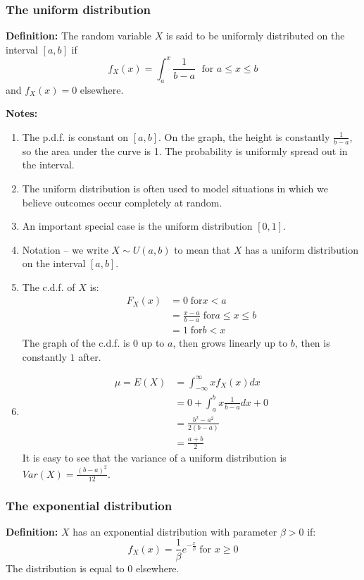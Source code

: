 \documentclass[12pt]{article}
\begin{document}
\subsubsection{The uniform distribution}
\textbf{Definition:} The random variable $X$ is said to be uniformly distributed on the interval $[a,b]$ if
\[
    f_X (x) = \int_a^x \frac{1}{b-a} \; \text{ for } a \leq x \leq b
\]
and $f_X (x) = 0$ elsewhere.

\textbf{Notes:}
\begin{enumerate}
    \item The p.d.f. is constant on $[a,b]$. On the graph, the height is constantly $\frac{1}{b-a}$, so the area under the curve is 1. The probability is uniformly spread out in the interval.
    \item The uniform distribution is often used to model situations in which we believe outcomes occur completely at random.
    \item An important special case is the uniform distribution $[0,1]$.
    \item Notation -- we write $X \sim U(a,b)$ to mean that $X$ has a uniform distribution on the interval $[a,b]$.
    \item The c.d.f. of $X$ is:
        \begin{align*}
            F_X (x) &= 0 \; \text{for} x < a \\
                &= \frac{x-a}{b-a} \; \text{for} a \leq x \leq b \\
                &= 1 \; \text{for} b < x
        \end{align*}
        The graph of the c.d.f. is $0$ up to $a$, then grows linearly up to $b$, then is constantly $1$ after.
    \item
        \begin{align*}
            \mu = E(X) &= \int_{-\infty}^{\infty} x f_X (x) dx \\
                &= 0 + \int_a^b x \frac{1}{b-a} dx + 0 \\
                &= \frac{b^2 -a^2}{2(b-a)} \\
                &= \frac{a+b}{2}
        \end{align*}
        It is easy to see that the variance of a uniform distribution is $Var(X) = \frac{(b-a)^2}{12}$.
\end{enumerate}

\subsubsection{The exponential distribution}
\textbf{Definition:} $X$ has an exponential distribution with parameter $\beta > 0$ if:
\[
    f_X (x) = \frac{1}{\beta} e^{- \frac{x}{\beta}} \; \text{for } x \geq 0
\]
The distribution is equal to $0$ elsewhere.
\end{document}
